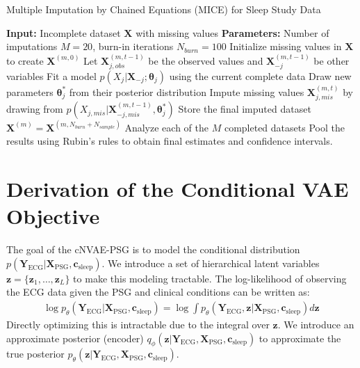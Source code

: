 \documentclass[11pt,en]{elegantpaper}
\begin{document}
\begin{algorithm}[H]
\caption{Multiple Imputation by Chained Equations (MICE) for Sleep Study Data}
\label{alg:mice}
\begin{algorithmic}[1]
\STATE \textbf{Input:} Incomplete dataset $\mathbf{X}$ with missing values
\STATE \textbf{Parameters:} Number of imputations $M=20$, burn-in iterations $N_{burn}=100$
    \STATE Initialize missing values in $\mathbf{X}$ to create $\mathbf{X}^{(m,0)}$
            \STATE Let $\mathbf{X}_{j,obs}^{(m,t-1)}$ be the observed values and $\mathbf{X}_{-j}^{(m,t-1)}$ be other variables
            \STATE Fit a model $p(X_j | \mathbf{X}_{-j}; \boldsymbol{\theta}_j)$ using the current complete data
            \STATE Draw new parameters $\boldsymbol{\theta}_j^*$ from their posterior distribution
            \STATE Impute missing values $\mathbf{X}_{j,mis}^{(m,t)}$ by drawing from $p(X_{j,mis} | \mathbf{X}_{-j,mis}^{(m,t-1)}, \boldsymbol{\theta}_j^*)$
        \ENDFOR
    \ENDFOR
    \STATE Store the final imputed dataset $\mathbf{X}^{(m)} = \mathbf{X}^{(m, N_{burn}+N_{sample})}$
\ENDFOR
\STATE Analyze each of the $M$ completed datasets
\STATE Pool the results using Rubin's rules to obtain final estimates and confidence intervals.
\end{algorithmic}
\end{algorithm}

\printbibliography[heading=bibintoc, title=\ebibname]

\appendix
\addappheadtotoc

\section{Derivation of the Conditional VAE Objective}
\label{app:elbo_derivation}

The goal of the cNVAE-PSG is to model the conditional distribution $p(\mathbf{Y}_{\text{ECG}} | \mathbf{X}_{\text{PSG}}, \mathbf{c}_{\text{sleep}})$. We introduce a set of hierarchical latent variables $\mathbf{z} = \{\mathbf{z}_1, \dots, \mathbf{z}_L\}$ to make this modeling tractable. The log-likelihood of observing the ECG data given the PSG and clinical conditions can be written as:
\begin{align}
\log p_\theta(\mathbf{Y}_{\text{ECG}} | \mathbf{X}_{\text{PSG}}, \mathbf{c}_{\text{sleep}}) = \log \int p_\theta(\mathbf{Y}_{\text{ECG}}, \mathbf{z} | \mathbf{X}_{\text{PSG}}, \mathbf{c}_{\text{sleep}}) d\mathbf{z}
\end{align}
Directly optimizing this is intractable due to the integral over $\mathbf{z}$. We introduce an approximate posterior (encoder) $q_\phi(\mathbf{z} | \mathbf{Y}_{\text{ECG}}, \mathbf{X}_{\text{PSG}}, \mathbf{c}_{\text{sleep}})$ to approximate the true posterior $p_\theta(\mathbf{z} | \mathbf{Y}_{\text{ECG}}, \mathbf{X}_{\text{PSG}}, \mathbf{c}_{\text{sleep}})$.
\end{document}
